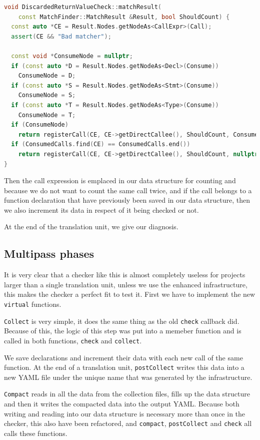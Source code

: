 \begin{lstlisting}[language={C++},caption={Catching nodes of used return values.},label={lst:consume}]
void DiscardedReturnValueCheck::matchResult(
	const MatchFinder::MatchResult &Result, bool ShouldCount) {
  const auto *CE = Result.Nodes.getNodeAs<CallExpr>(Call);
  assert(CE && "Bad matcher");

  const void *ConsumeNode = nullptr;
  if (const auto *D = Result.Nodes.getNodeAs<Decl>(Consume))
    ConsumeNode = D;
  if (const auto *S = Result.Nodes.getNodeAs<Stmt>(Consume))
    ConsumeNode = S;
  if (const auto *T = Result.Nodes.getNodeAs<Type>(Consume))
    ConsumeNode = T;
  if (ConsumeNode)
    return registerCall(CE, CE->getDirectCallee(), ShouldCount, ConsumeNode);
  if (ConsumedCalls.find(CE) == ConsumedCalls.end())
	return registerCall(CE, CE->getDirectCallee(), ShouldCount, nullptr);
}
\end{lstlisting}

Then the call expression is emplaced in our data structure for counting and because we do not want to count the same call twice, and if
the call belongs to a function declaration that have previously been saved in our data structure, then we also increment its data in
respect of it being checked or not.

At the end of the translation unit, we give our diagnosis.

\subsection{Multipass phases}

It is very clear that a checker like this is almost completely useless for projects larger than a single translation unit, unless we use
the enhanced infrastructure, this makes the checker a perfect fit to test it. First we have to implement the new \lstinline{virtual} functions.

\texttt{Collect} is very simple, it does the same thing as the old \texttt{check} callback did. Because of this, the logic of this step was put
into a memeber function and is called in both functions, \texttt{check} and \texttt{collect}.

We save declarations and increment their data with each new call of the same function. At the end of a translation unit, \texttt{postCollect}
writes this data into a new YAML file under the unique name that was generated by the infrastructure.

\texttt{Compact} reads in all the data from the collection files, fills up the data structure and then it writes the compacted data into the output YAML.
Because both writing and reading into our data structure is necessary more than once in the checker, this also have been refactored, and \texttt{compact},
\texttt{postCollect} and \texttt{check} all calls these functions.

